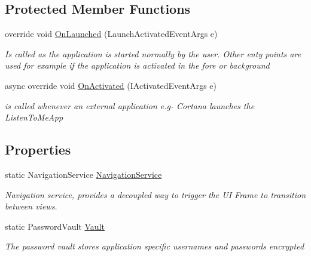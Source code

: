 \subsection*{Protected Member Functions}
\begin{DoxyCompactItemize}
\item 
override void \mbox{\hyperlink{class_listen_to_me_1_1_app_ace89a3624e2de8cc528dea8b1288d03f}{On\+Launched}} (Launch\+Activated\+Event\+Args e)
\begin{DoxyCompactList}\small\item\em Is called as the application is started normally by the user. Other enty points are used for example if the application is activated in the fore or background \end{DoxyCompactList}\item 
async override void \mbox{\hyperlink{class_listen_to_me_1_1_app_a3e2da49bb555b7fdc5858f5442d396e4}{On\+Activated}} (I\+Activated\+Event\+Args e)
\begin{DoxyCompactList}\small\item\em is called whenever an external application e.\+g-\/ Cortana launches the Listen\+To\+Me\+App \end{DoxyCompactList}\end{DoxyCompactItemize}
\subsection*{Properties}
\begin{DoxyCompactItemize}
\item 
static Navigation\+Service \mbox{\hyperlink{class_listen_to_me_1_1_app_ae35ddc10bf8aad1a80c92c71c6e3b7fc}{Navigation\+Service}}
\begin{DoxyCompactList}\small\item\em Navigation service, provides a decoupled way to trigger the UI Frame to transition between views. \end{DoxyCompactList}\item 
static Password\+Vault \mbox{\hyperlink{class_listen_to_me_1_1_app_ad1b3a77f44f52055446727716abfccc6}{Vault}}
\begin{DoxyCompactList}\small\item\em The password vault stores application specific usernames and passwords encrypted \end{DoxyCompactList}\end{DoxyCompactItemize}
